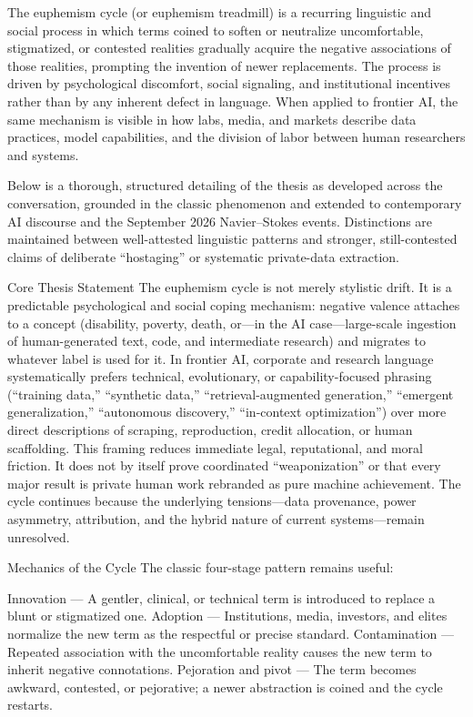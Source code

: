 The euphemism cycle (or euphemism treadmill) is a recurring linguistic and social process in which terms coined to soften or neutralize uncomfortable, stigmatized, or contested realities gradually acquire the negative associations of those realities, prompting the invention of newer replacements. The process is driven by psychological discomfort, social signaling, and institutional incentives rather than by any inherent defect in language. When applied to frontier AI, the same mechanism is visible in how labs, media, and markets describe data practices, model capabilities, and the division of labor between human researchers and systems.

Below is a thorough, structured detailing of the thesis as developed across the conversation, grounded in the classic phenomenon and extended to contemporary AI discourse and the September 2026 Navier–Stokes events. Distinctions are maintained between well-attested linguistic patterns and stronger, still-contested claims of deliberate “hostaging” or systematic private-data extraction.

Core Thesis Statement
The euphemism cycle is not merely stylistic drift. It is a predictable psychological and social coping mechanism: negative valence attaches to a concept (disability, poverty, death, or—in the AI case—large-scale ingestion of human-generated text, code, and intermediate research) and migrates to whatever label is used for it. In frontier AI, corporate and research language systematically prefers technical, evolutionary, or capability-focused phrasing (“training data,” “synthetic data,” “retrieval-augmented generation,” “emergent generalization,” “autonomous discovery,” “in-context optimization”) over more direct descriptions of scraping, reproduction, credit allocation, or human scaffolding. This framing reduces immediate legal, reputational, and moral friction. It does not by itself prove coordinated “weaponization” or that every major result is private human work rebranded as pure machine achievement. The cycle continues because the underlying tensions—data provenance, power asymmetry, attribution, and the hybrid nature of current systems—remain unresolved.

Mechanics of the Cycle
The classic four-stage pattern remains useful:

Innovation — A gentler, clinical, or technical term is introduced to replace a blunt or stigmatized one.  
Adoption — Institutions, media, investors, and elites normalize the new term as the respectful or precise standard.  
Contamination — Repeated association with the uncomfortable reality causes the new term to inherit negative connotations.  
Pejoration and pivot — The term becomes awkward, contested, or pejorative; a newer abstraction is coined and the cycle restarts.

